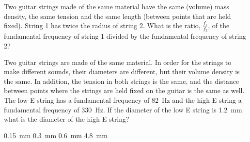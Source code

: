 \question Two guitar strings made of the same material have the same (volume) mass density, the same tension and the same length (between points that are held fixed). String 1 has twice the radius of string 2. What is the ratio, $\frac{f_1}{f_2}$, of the fundamental frequency of string 1 divided by the fundamental frequency of string 2?
\begin{choices} 
 \correct
{}
\end{choices}


\question Two guitar strings are made of the same material. In order for the strings to make different sounds, their diameters are different, but their volume density is the same. In addition, the tension in both strings is the same, and the distance between points where the strings are held fixed on the guitar is the same as well. The low E string has a fundamental frequency of \SI{82}{Hz} and the high E string a fundamental frequency of \SI{330}{Hz}. If the diameter of the low E string is \SI{1.2}{mm} what is the diameter of the high E string?
\begin{choices} 
\choice \SI{0.15}{mm}
\CorrectChoice \SI{0.3}{mm} \correct
\choice \SI{0.6}{mm}
\choice \SI{4.8}{mm}
\end{choices}

